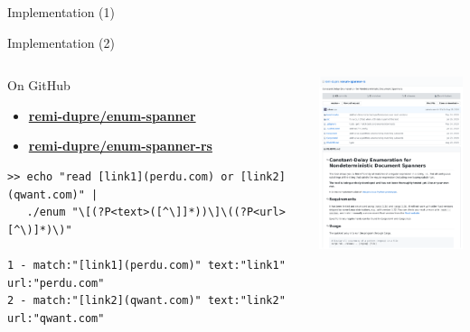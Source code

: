 \documentclass{beamer}
\begin{document}
\begin{frame}{Implementation (1)}
\begin{center}
    \end{center}
  \end{frame}

  \begin{frame}[fragile]{Implementation (2)}
    \begin{columns}
      \begin{column}{0.55\textwidth}
        On GitHub
        \begin{itemize}
           \item \textbf{\href{https://github.com/remi-dupre/enum-spanner}{remi-dupre/enum-spanner}}
          \item
            \textbf{\href{https://github.com/remi-dupre/enum-spanner-rs}{remi-dupre/enum-spanner-rs}}
        \end{itemize}

        \vspace{2cm}

        \tiny
        \begin{verbatim}
>> echo "read [link1](perdu.com) or [link2](qwant.com)" |
   ./enum "\[(?P<text>([^\]]*))\]\((?P<url>[^\)]*)\)"

1 - match:"[link1](perdu.com)" text:"link1" url:"perdu.com"
2 - match:"[link2](qwant.com)" text:"link2" url:"qwant.com"
        \end{verbatim}
      \end{column}
      \begin{column}{0.45\textwidth}
        \includegraphics[width=5.5cm]{figures/github}
      \end{column}
    \end{columns}
  \end{frame}
\end{document}
